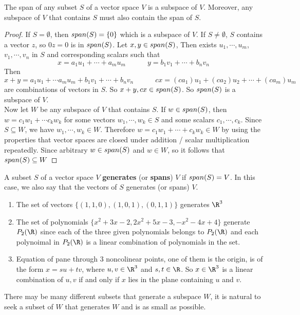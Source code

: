 \documentclass[11pt]{article}
\begin{document}
\begin{theorem*}
    The span of any subset $S$ of a vector space $V$ is a subspace of $V$. Moreover, any subspace of $V$ that contains $S$ must also contain the span of $S$. 
    \begin{proof}
        If $S=\emptyset$, then $span(S) = \{ 0\}$ which is a subspace of $V$. If $S\neq \emptyset$, $S$ contains a vector $z$, so $0z = 0$ is in $span(S)$. Let $x,y\in span(S)$, Then exists $u_1,\cdots, u_m$, $v_1,\cdots, v_n$ in $S$ and corresponding scalars such that 
        \[
            x = a_1 u_1 + \cdots + a_m u_m 
            \quad \quad \quad 
            y = b_1 v_1 + \cdots + b_n v_n
        \]
        Then 
        \[
            x+y=a_1 u_1 + \cdots a_m u_m + b_1 v_1 + \cdots + b_n v_n 
            \quad \quad \quad 
            cx = (ca_1)u_1 + (ca_2)u_2 + \cdots + (ca_m)u_m    
        \]
        are combinations of vectors in $S$. So $x+y, cx \in span(S)$. So $span(S)$ is a subspace of $V$. \\
        Now let $W$ be any subspace of $V$ that contains $S$. If $w\in span(S)$, then $w = c_1 w_1 + \cdots c_k w_k$ for some vectors $w_1,\cdots, w_k \in S$ and some scalars $c_1, \cdots, c_k$. Since $S\subseteq W$, we have $w_1,\cdots, w_k \in W$. Therefore $w=c_1 w_1 + \cdots + c_k w_k \in W$ by using the properties that vector spaces are closed under addition / scalar multiplication repeatedly. Since arbitrary $w\in span(S)$ and $w\in W$, so it follows that $span(S)\subseteq W$ 
    \end{proof}
\end{theorem*}

\begin{defn*}
    A subset $S$ of a vector space $V$ \textbf{generates} (or \textbf{spans}) $V$ if $span(S)=V$. In this case, we also say that the vectors of $S$ generates (or spans) $V$.
    \begin{enumerate}
        \item The set of vectors $\{ (1,1,0), (1,0,1), (0,1,1)\}$ generates $\R^3$
        \item The set of polynomials $\{x^2+3x-2, 2x^2+5x-3,-x^2-4x+4 \}$ generate $P_2(\R)$ since each of the three given polynomials belongs to $P_2(\R)$ and each polynoimal in $P_2(\R)$ is a linear combination of polynomials in the set. 
        \item Equation of pane through 3 noncolinear points, one of them is the origin, is of the form $x=su+tv$, where $u,v\in\R^3$ and $s,t\in\R$. So $x\in \R^3$ is a linear combination of $u,v$ if and only if $x$ lies in the plane containing $u$ and $v$. 
    \end{enumerate}
    There may be many different subsets that generate a subspace $W$, it is natural to seek a subset of $W$ that generates $W$ and is as small as possible. 
\end{defn*}
\end{document}
